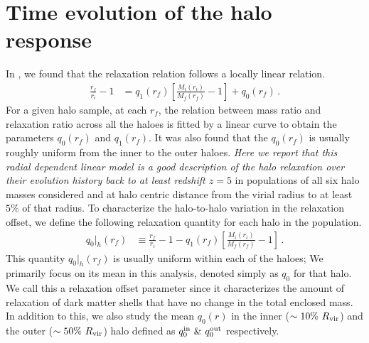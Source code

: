 \section{Time evolution of the halo response}
\label{sec:methods-relchar}
In , we found that the relaxation relation follows a locally linear relation. 
\begin{align}
    \label{eq:chi-linear-q0}
    \frac{r_f}{r_i} - 1 &= q_1(r_f) \left[ \frac{M_i(r_i)}{M_f(r_f)} - 1 \right] + q_0(r_f)\,.
\end{align}
For a given halo sample, at each $r_f$, the relation between mass ratio and relaxation ratio across all the haloes is fitted by a linear curve to obtain the parameters $q_0(r_f)$ and $q_1(r_f)$. It was also found that the $q_0(r_f)$ is usually roughly uniform from the inner to the outer haloes. \emph{Here we report that this radial dependent linear model is a good description of the halo relaxation over their evolution history back to at least redshift $z=5$} in populations of all six halo masses considered and at halo centric distance from the virial radius to at least $5 \%$ of that radius. To characterize the halo-to-halo variation in the relaxation offset, we define the following relaxation quantity for each halo in the population. 
\begin{align}
\label{eq:def-q0hal}
q_0 |_{h}(r_f) &\equiv \frac{r_f}{r_i} - 1 - q_1(r_f) \left[ \frac{M_i(r_i)}{M_f(r_f)} - 1 \right]\,.
\end{align}
This quantity $q_0 |_{h}(r_f)$ is usually uniform within each of the haloes; We primarily focus on its mean in this analysis, denoted simply as $q_0$ for that halo. We call this a relaxation offset parameter since it characterizes the amount of relaxation of dark matter shells that have no change in the total enclosed mass. In addition to this, we also study the mean $q_0(r)$ in the inner ($\sim 10\%~R_{\rm{vir}}$) and the outer ($\sim 50\%~R_{\rm{vir}}$) halo defined as $q_0^{\rm{in}} ~\& ~q_0^{\rm{out}}$ respectively.

